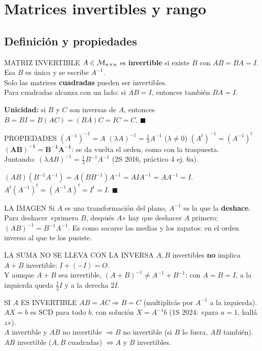 \chapter{Matrices invertibles y rango}

\section{Definición y propiedades}
\begin{sello}{MATRIZ INVERTIBLE}
$A\in\mathcal{M}_{n\times n}$ es \textbf{invertible} si existe $B$ con $AB=BA=I$. Esa $B$ es única y se escribe $A^{-1}$.\\[2pt]
Solo las matrices \textbf{cuadradas} pueden ser invertibles.\\[2pt]
Para cuadradas alcanza con un lado: si $AB=I$, entonces también $BA=I$.
\end{sello}
\begin{demo}
\textbf{Unicidad:} si $B$ y $C$ son inversas de $A$, entonces $B=BI=B(AC)=(BA)C=IC=C$. $\blacksquare$
\end{demo}
\begin{sello}{PROPIEDADES}
$(A^{-1})^{-1}=A$ \qquad $(\lambda A)^{-1}=\frac1\lambda A^{-1}$ ($\lambda\neq0$) \qquad $(A^t)^{-1}=(A^{-1})^t$\\[2pt]
$\boldsymbol{(AB)^{-1}=B^{-1}A^{-1}}$: se da vuelta el orden, como con la traspuesta.\\[2pt]
Juntando: $(\lambda AB)^{-1}=\frac1\lambda B^{-1}A^{-1}$ (2S 2016, práctico 4 ej. 6a).
\end{sello}
\begin{demo}
$(AB)(B^{-1}A^{-1})=A(BB^{-1})A^{-1}=AIA^{-1}=AA^{-1}=I$. \\
$A^t(A^{-1})^t=(A^{-1}A)^t=I^t=I$. $\blacksquare$
\end{demo}
\begin{tip}{LA IMAGEN}
Si $A$ es una transformación del plano, $A^{-1}$ es la que la \textbf{deshace}. Para deshacer «primero $B$, después $A$» hay que deshacer $A$ primero: $(AB)^{-1}=B^{-1}A^{-1}$. Es como sacarse las medias y los zapatos: en el orden inverso al que te los pusiste.
\end{tip}
\begin{trampa}{LA SUMA NO SE LLEVA CON LA INVERSA}
$A,B$ invertibles \textbf{no} implica $A+B$ invertible: $I+(-I)=O$.\\
Y aunque $A+B$ sea invertible, $(A+B)^{-1}\neq A^{-1}+B^{-1}$: con $A=B=I$, a la izquierda queda $\frac12I$ y a la derecha $2I$.
\end{trampa}
\begin{memo}{SI $A$ ES INVERTIBLE}
$AB=AC\Rightarrow B=C$ (multiplicás por $A^{-1}$ a la izquierda).\\
$AX=b$ es SCD para todo $b$, con solución $X=A^{-1}b$ (1S 2024: «para $a=1$, hallá $z$»).\\
$A$ invertible y $AB$ no invertible $\Rightarrow B$ no invertible (si $B$ lo fuera, $AB$ también).\\
$AB$ invertible ($A,B$ cuadradas) $\iff A$ y $B$ invertibles.
\end{memo}

